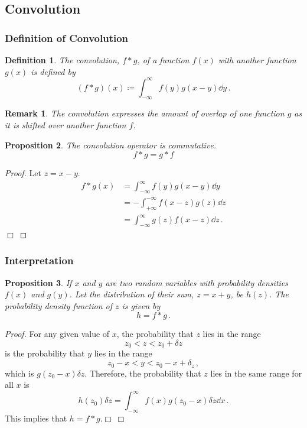 \documentclass{article}
\theoremstyle{plain}\theoremheaderfont{\normalfont\itshape}\theorembodyfont{\rmfamily}\theoremseparator{.}\newtheorem*{rem}{Remark}\newtheorem*{ex}{Example}\newtheorem*{proof}{Proof}\newtheorem*{altp}{Alternative proof}
\theoremstyle{plain}\theoremheaderfont{\normalfont\bfseries}\theorembodyfont{\rmfamily}\theoremseparator{.}\newtheorem{thm}{Theorem}[section]\newtheorem{lem}[thm]{Lemma}\newtheorem{prop}[thm]{Proposition}\newtheorem*{cor}{Corollary}\newtheorem{defn}[thm]{Definition}\newtheorem{clm}[thm]{Claim}\newtheorem{clminproof}{Claim}
\theoremstyle{break}\theoremheaderfont{\normalfont\itshape}\theorembodyfont{\rmfamily}\theoremseparator{.\medskip}\newtheorem*{proofskip}{Proof}\newtheorem*{exs}{Examples}\newtheorem*{rems}{Remarks}
\theoremstyle{break}\theoremheaderfont{\normalfont\bfseries}\theorembodyfont{\rmfamily}\theoremseparator{.\medskip}\newtheorem{lemskip}[thm]{Lemma}\newtheorem{defnskip}[thm]{Definition}\newtheorem{propskip}[thm]{Proposition}\newtheorem{thmskip}[thm]{Theorem}
\numberwithin{equation}{section}
\newcommand{\qed}{\hfill\ensuremath{\Box}}
\begin{document}
	\subsection{Convolution}
	\subsubsection{Definition of Convolution}
	\begin{defn}
		The \textit{convolution}, \(f*g\), of a function \(f(x)\) with another function \(g(x)\) is defined by
		\[(f*g)(x)\coloneqq\int_{-\infty}^{\infty}f(y)g(x-y)\dd{y}\,.\]
	\end{defn}
	\begin{rem}
		The convolution expresses the amount of overlap of one function \(g\) as it is shifted over another function \(f\).
	\end{rem}
	
	\begin{prop}
		The convolution operator is commutative.
		\[f*g=g*f\]
	\end{prop}
	\begin{proof}
		Let \(z=x-y\).
		\begin{align*}
			f*g(x)&=\int_{-\infty}^{\infty}f(y)g(x-y)\dd{y}\\
			&=-\int_{+\infty}^{-\infty}f(x-z)g(z)\dd{z}\\
			&=\int_{-\infty}^{\infty}g(z)f(x-z)\dd{z}\,.
		\end{align*}\qed
	\end{proof}
	
	\subsubsection{Interpretation}
	\begin{prop}
		If \(x\) and \(y\) are two random variables with probability densities \(f(x)\) and \(g(y)\). Let the distribution of their sum, \(z=x+y\), be \(h(z)\). The probability density function of \(z\) is given by
		\[h=f*g\,.\]
	\end{prop}
	
	\begin{proof}
		For any given value of \(x\), the probability that \(z\) lies in the range
		\[z_0<z<z_0+\delta z\]
		is the probability that \(y\) lies in the range
		\[z_0-x<y<z_0-x+\delta_z\,,\]
		which is \(g(z_0-x)\delta z\). Therefore, the probability that \(z\) lies in the same range for all \(x\) is
		\[h(z_0)\delta z=\int_{-\infty}^{\infty}f(x)g(z_0-x)\delta z\dd{x}\,.\]
		This implies that \(h=f*g\).\qed
	\end{proof}
	
\end{document}
